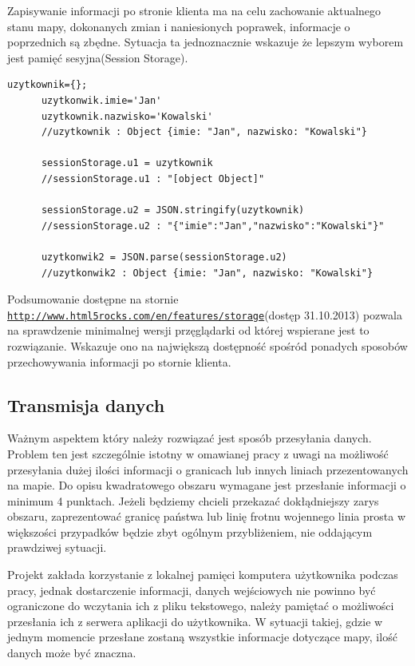 Zapisywanie informacji po stronie klienta ma na celu zachowanie aktualnego stanu mapy, dokonanych zmian i naniesionych poprawek, informacje o poprzednich są zbędne. Sytuacja ta jednoznacznie wskazuje że lepszym wyborem jest pamięć sesyjna(Session Storage).

\lstset{language=JavaScript}
\label{lis:storage}
\begin{lstlisting}[caption=json]
      uzytkownik={};
      uzytkonwik.imie='Jan'
      uzytkownik.nazwisko='Kowalski'
      //uzytkownik : Object {imie: "Jan", nazwisko: "Kowalski"}

      sessionStorage.u1 = uzytkownik
      //sessionStorage.u1 : "[object Object]"

      sessionStorage.u2 = JSON.stringify(uzytkownik)
      //sessionStorage.u2 : "{"imie":"Jan","nazwisko":"Kowalski"}"

      uzytkonwik2 = JSON.parse(sessionStorage.u2)
      //uzytkonwik2 : Object {imie: "Jan", nazwisko: "Kowalski"}
\end{lstlisting}


Podsumowanie dostępne na stornie \underline{\texttt{http://www.html5rocks.com/en/features/storage}}(dostęp 31.10.2013) pozwala na sprawdzenie minimalnej wersji przęglądarki od której wspierane jest to rozwiązanie. Wskazuje ono na największą dostępność spośród ponadych sposobów przechowywania informacji po stornie klienta.

\subsection{Transmisja danych}
\label{subsec:transmisjaDanych}

Ważnym aspektem który należy rozwiązać jest sposób przesyłania danych. Problem ten jest szczególnie istotny w omawianej pracy z uwagi na możliwość przesyłania dużej ilości informacji o granicach lub innych liniach przezentowanych na mapie. Do opisu kwadratowego obszaru wymagane jest przesłanie informacji o minimum 4 punktach. Jeżeli będziemy chcieli przekazać dokłądniejszy zarys obszaru, zaprezentować granicę państwa lub linię frotnu wojennego linia prosta w większości przypadków będzie zbyt ogólnym przybliżeniem, nie oddającym prawdziwej sytuacji.

Projekt zakłada korzystanie z lokalnej pamięci komputera użytkownika podczas pracy, jednak dostarczenie informacji, danych wejściowych nie powinno być ograniczone do wczytania ich z pliku tekstowego, należy pamiętać o możliwości przesłania ich z serwera aplikacji do użytkownika. W sytuacji takiej, gdzie w jednym momencie przesłane zostaną wszystkie informacje dotyczące mapy, ilość danych może być znaczna.

